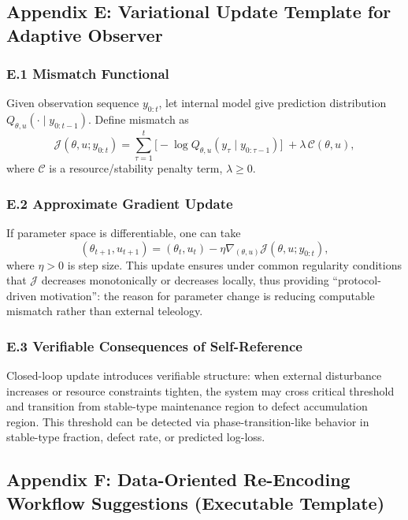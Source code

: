 \subsection{Appendix E: Variational Update Template for Adaptive Observer}

\subsubsection{E.1 Mismatch Functional}

Given observation sequence $y_{0:t}$, let internal model give prediction distribution $Q_{\theta,u}(\cdot\mid y_{0:t-1})$. Define mismatch as
\[
\mathcal{J}(\theta,u;y_{0:t})
=
\sum_{\tau=1}^{t} \Big[-\log Q_{\theta,u}(y_{\tau}\mid y_{0:\tau-1})\Big]
\;+\lambda\,\mathcal{C}(\theta,u),
\]
where $\mathcal{C}$ is a resource/stability penalty term, $\lambda\ge0$.

\subsubsection{E.2 Approximate Gradient Update}

If parameter space is differentiable, one can take
\[
(\theta_{t+1},u_{t+1})
=
(\theta_t,u_t) - \eta \nabla_{(\theta,u)} \mathcal{J}(\theta,u;y_{0:t}),
\]
where $\eta>0$ is step size. This update ensures under common regularity conditions that $\mathcal{J}$ decreases monotonically or decreases locally, thus providing ``protocol-driven motivation'': the reason for parameter change is reducing computable mismatch rather than external teleology.

\subsubsection{E.3 Verifiable Consequences of Self-Reference}

Closed-loop update introduces verifiable structure: when external disturbance increases or resource constraints tighten, the system may cross critical threshold and transition from stable-type maintenance region to defect accumulation region. This threshold can be detected via phase-transition-like behavior in stable-type fraction, defect rate, or predicted log-loss.

\subsection{Appendix F: Data-Oriented Re-Encoding Workflow Suggestions (Executable Template)}


